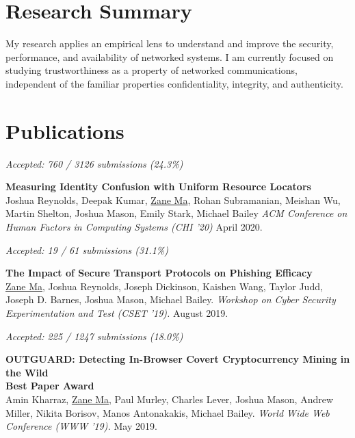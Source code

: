\documentclass[10pt,singlecolumn]{article} %
\begin{document}
\section{Research Summary} 

My research applies an empirical lens to understand and improve the security,
performance, and availability of networked systems. I am currently focused on
studying trustworthiness as a property of networked communications, independent
of the familiar properties confidentiality, integrity, and authenticity. \\

\section{Publications} 


\vspace{6pt}

{\raggedleft\textit{Accepted: 760 / 3126 submissions (24.3\%)}\par}

\textbf{Measuring Identity Confusion with Uniform Resource Locators}\\
Joshua Reynolds, Deepak Kumar, \underline{Zane Ma}, Rohan Subramanian, Meishan Wu, Martin Shelton, Joshua Mason, Emily Stark, Michael Bailey
\textit{ACM Conference on Human Factors in Computing Systems (CHI '20)} April 2020.

\vspace{6pt}

{\raggedleft\textit{Accepted: 19 / 61 submissions (31.1\%)}\par}

\textbf{The Impact of Secure Transport Protocols on Phishing Efficacy}\\
\underline{Zane Ma}, Joshua Reynolds, Joseph Dickinson, Kaishen Wang, Taylor Judd, Joseph D. Barnes, Joshua Mason, Michael Bailey.
\textit{Workshop on Cyber Security Experimentation and Test (CSET '19).} August 2019.

\vspace{6pt}

{\raggedleft\textit{Accepted: 225 / 1247 submissions (18.0\%)}\par}

\textbf{OUTGUARD: Detecting In-Browser Covert Cryptocurrency Mining in the Wild}\\
    \textbf{\color{headings}Best Paper Award}\\
Amin Kharraz, \underline{Zane Ma}, Paul Murley, Charles Lever, Joshua Mason, Andrew Miller,
Nikita Borisov, Manos Antonakakis, Michael Bailey. 
\textit{World Wide Web Conference (WWW '19).} May 2019.
\end{document}
